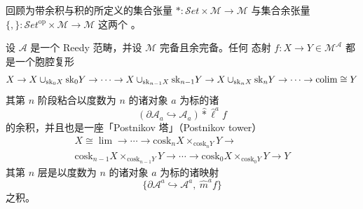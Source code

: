 回顾为带余积与积的\trCategory{}所定义的集合张量
$\ast\colon\mathcal{S}et\times\mathcal{M}\to\mathcal{M}$ 与集合余张量
$\{,\}\colon\mathcal{S}et^{\mathrm{op}}\times\mathcal{M}\to\mathcal{M}$ 这两个%
\trBifunctor。

\begin{corollary}\label{cor:morphism-cell-complex}
设 $\mathcal{A}$ 是一个 Reedy 范畴，并设 $\mathcal{M}$ 完备且余完备。任何
态射 $f\colon X\to Y\in\mathcal{M}^{\mathcal{A}}$ 都是一个胞腔复形
\[ X\to
   X\cup_{\mathrm{sk}_0X}\mathrm{sk}_0Y\to\cdots\to
   X\cup_{\mathrm{sk}_{n-1}X}\mathrm{sk}_{n-1}Y\to
   X\cup_{\mathrm{sk}_nX}\mathrm{sk}_nY\to\cdots\to
   \operatorname{colim}\cong Y \]
其第 $n$ 阶段粘合以度数为 $n$ 的诸对象 $a$ 为标的诸\trCell
\[ (\partial\mathcal{A}_a\hookrightarrow\mathcal{A}_a)\mathbin{\widehat{\ast}}
   \hat{\ell}^{a}f \]
的余积，并且也是一座「Postnikov 塔」（Postnikov tower）
\[ \begin{gathered}
X\cong\lim\to\cdots\to
\mathrm{cosk}_nX\times_{\mathrm{cosk}_nY}Y\to\\
\mathrm{cosk}_{n-1}X\times_{\mathrm{cosk}_{n-1}Y}Y\to\cdots\to
\mathrm{cosk}_0X\times_{\mathrm{cosk}_0Y}Y\to Y
\end{gathered} \]
其第 $n$ 层是以度数为 $n$ 的诸对象 $a$ 为标的诸映射
\[ \{\partial\mathcal{A}^{a}\hookrightarrow\mathcal{A}^{a},\ \hat{m}^{a}f\} \]
之积。
\end{corollary}

